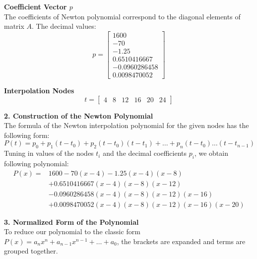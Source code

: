 \vspace{5pt}
\noindent\textbf{Coefficient Vector $p$} \\
The coefficients of Newton polynomial correspond to the diagonal elements of matrix $A$. The decimal values:
\begin{equation*}
    p = \begin{bmatrix} 
        1600 \\ -70 \\ -1.25 \\ 0.6510416667 \\ -0.0960286458 \\ 0.0098470052 
    \end{bmatrix}
\end{equation*}

\vspace{5pt}
\noindent\textbf{Interpolation Nodes} \\
\begin{equation*}
    t = \begin{bmatrix} 4 & 8 & 12 & 16 & 20 & 24 \end{bmatrix}
\end{equation*}

\vspace{5pt}
\noindent\textbf{2. Construction of the Newton Polynomial} \\
The formula of the Newton interpolation polynomial for the given nodes has the following form:
\begin{equation*}
    P(t) = p_0 + p_1(t - t_0) + p_2(t - t_0)(t - t_1) + \dots + p_n(t - t_0)\dots(t - t_{n-1})
\end{equation*}
Tuning in values of the nodes $t_i$ and the decimal coefficients $p_i$, we obtain following polynomial:
\begin{equation}
    \begin{aligned}
        P(x) ={}& 1600 - 70(x - 4) - 1.25(x - 4)(x - 8) \\
        &+ 0.6510416667(x - 4)(x - 8)(x - 12) \\
        &- 0.0960286458(x - 4)(x - 8)(x - 12)(x - 16) \\
        &+ 0.0098470052(x - 4)(x - 8)(x - 12)(x - 16)(x - 20)
    \end{aligned}
\end{equation}

\vspace{5pt}
\noindent\textbf{3. Normalized Form of the Polynomial} \\
To reduce our polynomial to the classic form $P(x) = a_n x^n + a_{n-1} x^{n-1} + \dots + a_0$, the brackets are expanded and terms are grouped together.

